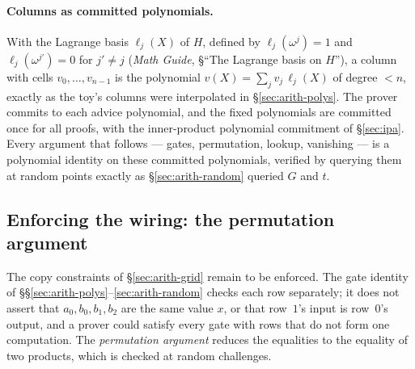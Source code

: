 \documentclass[11pt,a4paper]{article}
\theoremstyle{definition}
\begin{document}
\paragraph{Columns as committed polynomials.}
With the Lagrange basis $\ell_j(X)$ of $H$, defined by
$\ell_j(\omega^j) = 1$ and $\ell_j(\omega^{j'}) = 0$ for $j' \ne j$
(\emph{Math Guide}, \S``The Lagrange basis on $H$''), a column with cells
$v_0, \dots, v_{n-1}$ is the polynomial
$v(X) = \sum_j v_j\,\ell_j(X)$ of degree $< n$, exactly as the toy's
columns were interpolated in \S\ref{sec:arith-polys}. The prover commits
to each advice polynomial, and the fixed polynomials are committed once
for all proofs, with the inner-product polynomial commitment of
\S\ref{sec:ipa}. Every argument that follows --- gates, permutation,
lookup, vanishing --- is a polynomial identity on these committed
polynomials, verified by querying them at random points exactly as
\S\ref{sec:arith-random} queried $G$ and $t$.

\subsection{Enforcing the wiring: the permutation argument}
\label{sec:arith-perm}

The copy constraints of \S\ref{sec:arith-grid} remain to be enforced.
The gate identity of \S\S\ref{sec:arith-polys}--\ref{sec:arith-random}
checks each row separately; it does not assert that $a_0, b_0, b_1, b_2$
are the same value $x$, or that row~$1$'s input is row~$0$'s output, and
a prover could satisfy every gate with rows that do not form one
computation. The \emph{permutation argument} reduces the equalities to
the equality of two products, which is checked at random challenges.
\end{document}
